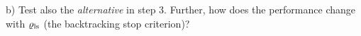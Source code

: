 b) Test also the \emph{alternative} in step 3. Further, how does the
performance change with $\varrho_\text{ls}$ (the backtracking stop criterion)?







\exerfoot
